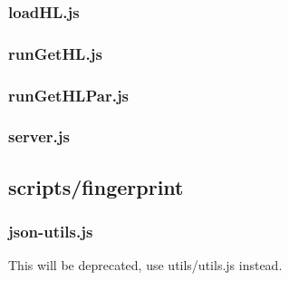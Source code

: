 \documentclass[a4paper,11pt]{report}
\begin{document}
\subsubsection{loadHL.js}
\subsubsection{runGetHL.js}
\subsubsection{runGetHLPar.js}
\subsubsection{server.js}

\subsection{scripts/fingerprint}
%
\subsubsection{json-utils.js}
This will be deprecated, use utils/utils.js instead.
%
\end{document}
